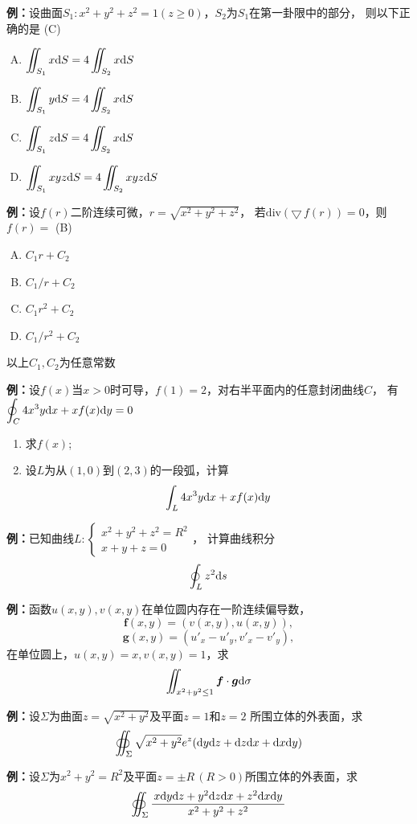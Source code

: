 {\bf 例：}设曲面$S_1:x^2+y^2+z^2=1(z\geq
  0)$，$S_2$为$S_1$在第一卦限中的部分，
  则以下正确的是\;
  (C) 
  \begin{enumerate}[(A)]
  \setlength{\itemindent}{1cm}
    \item $\displaystyle\iint_{S_1}x\mathrm{d} S=4\iint_{S_2}x\mathrm{d} S$
    \item $\displaystyle\iint_{S_1}y\mathrm{d} S=4\iint_{S_2}x\mathrm{d} S$
    \item $\displaystyle\iint_{S_1}z\mathrm{d} S=4\iint_{S_2}x\mathrm{d} S$
    \item $\displaystyle\iint_{S_1}xyz\mathrm{d} S=4\iint_{S_2}xyz\mathrm{d} S$
  \end{enumerate}

{\bf 例：}设$f(r)$二阶连续可微，$r=\sqrt{x^2+y^2+z^2}$，
  若$\mathrm{div}(\bigtriangledown\,f(r))=0$，则$f(r)=$\;
  (B) 
  \begin{enumerate}[(A)]
  \setlength{\itemindent}{1cm}
    \item $C_1r+C_2$
    \item $C_1/r+C_2$
    \item $C_1r^2+C_2$
    \item $C_1/r^2+C_2$
  \end{enumerate}
  以上$C_1,C_2$为任意常数

{\bf 例：}设$f(x)$当$x>0$时可导，$f(1)=2$，对右半平面内的任意封闭曲线$C$，
有$\displaystyle\oint_C4x^3y\mathrm{d} x+xf(x)\mathrm{d} y=0$
\begin{enumerate}[(1)]
  \setlength{\itemindent}{1cm}
  \item 求$f(x)$;
  \item 设$L$为从$(1,0)$到$(2,3)$的一段弧，计算
  $$\displaystyle\int_L4x^3y\mathrm{d} x+xf(x)\mathrm{d} y$$
\end{enumerate}

{\bf 例：}已知曲线$L:\left\{\begin{array}{l}
	x^2+y^2+z^2=R^2\\ x+y+z=0
\end{array}\right.$，
计算曲线积分
$$\oint_Lz^2\mathrm{d} s$$

{\bf 例：}函数$u(x,y),v(x,y)$在单位圆内存在一阶连续偏导数，
$$\bm{f}(x,y)=(v(x,y),u(x,y)),$$
$$\bm{g}(x,y)=\left(u'_x-u'_y,v'_x-v'_y\right),$$
在单位圆上，$u(x,y)=x,v(x,y)=1$，求
$$\iint_{x^2+y^2\leq 1}\bm{f}\cdot\bm{g}\mathrm{d}\sigma$$

{\bf 例：}设$\Sigma$为曲面$z=\sqrt{x^2+y^2}$及平面$z=1$和$z=2$
所围立体的外表面，求
$$\oiint_{\Sigma}\sqrt{x^2+y^2}e^z(\mathrm{d} y\mathrm{d} z+\mathrm{d} z\mathrm{d} x+\mathrm{d} x\mathrm{d} y)$$

{\bf 例：}设$\Sigma$为$x^2+y^2=R^2$及平面$z=\pm R\,(R>0)$所围立体的外表面，求
$$\oiint_{\Sigma}\displaystyle\frac{\,{x\mathrm{d} y\mathrm{d} z+y^2\mathrm{d} z\mathrm{d} x+z^2\mathrm{d} x\mathrm{d} y}\,}{\,{x^2+y^2+z^2}\,}$$

